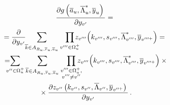 \begin{multicols}{2}
  \noindent
  \begin{multline}
     \fr{\partial g \left(\overline{a}_u, \overline{\Lambda}_u^*, 
\overline{y}_u\right)}{\partial y_{v^\prime}}={}\\
\hspace*{-3pt}{}=
\fr{\partial}{\partial 
y_{v^\prime}}\hspace*{-3pt}\sum\limits_{\overline{k} \in A_{R_u, \overline{r}_u, 
\overline{a}_u}} \prod\limits_{v^{\prime\prime\prime}\in\Omega_u^+ } 
\!\!\!\!\!z_{ v^{\prime\prime\prime}}\!\left(k_{ v^{\prime\prime\prime}}, 
s_{v^{\prime\prime\prime}}, \overline{\Lambda}_{ v^{\prime\prime\prime}}^*, 
\overline{y}_{ v^{\prime\prime\prime +}}\right)={}\\
     {}=\!\!\!\!\!\sum\limits_{v^{\prime\prime}\in \Omega_u^+} 
     \sum\limits_{\overline{k}\in A_{R_u, \overline{r}_u, \overline{a}_u}} 
     \prod\limits_{\substack{{v^{\prime\prime\prime}\in \Omega_u^+,}\\ 
{v^{\prime\prime\prime}\not=v^{\prime\prime}}}}
\!\!\!\!\!     z_{ v^{\prime\prime\prime}}\!\left(
     k_{ v^{\prime\prime\prime}},
     s_{ v^{\prime\prime\prime}}, \overline{\Lambda}^*_{ 
v^{\prime\prime\prime}}, \overline{y}_{ v^{\prime\prime\prime +}}\right)\times{}\\
{}\times
     \fr{\partial z_{ v^{\prime\prime}}
     \left(k_{v^{\prime\prime}}, s_{ v^{\prime\prime}}, \overline{\Lambda}_{ 
v^{\prime\prime}}, \overline{y}_{v^{\prime\prime +}}\right)} 
     {\partial y_{v^\prime}}\,.
     \label{e9aga}
     \end{multline}
     
     
   

\end{multicols}
